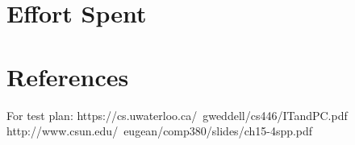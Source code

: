 \documentclass[12pt,titlepage]{article}
\begin{document}




\section{Effort Spent}

\section{References}
For test plan:
https://cs.uwaterloo.ca/~gweddell/cs446/ITandPC.pdf
http://www.csun.edu/~eugean/comp380/slides/ch15-4spp.pdf
\end{document}
